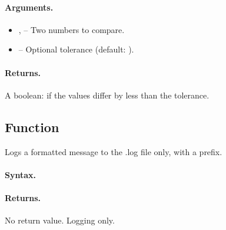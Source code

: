 \paragraph{Arguments.}
\begin{itemize}
\item {},  – Two numbers to compare.
\item {} – Optional tolerance (default: ).
\end{itemize}

\paragraph{Returns.}
A boolean:  if the values differ by less than the tolerance.


\subsection{Function } %
\label{sub:function_utils_wlog}

Logs a formatted message to the .log file only, with a  prefix.

\paragraph{Syntax.}
\begin{center}
\end{center}

\paragraph{Returns.}
No return value. Logging only.


\endinput
